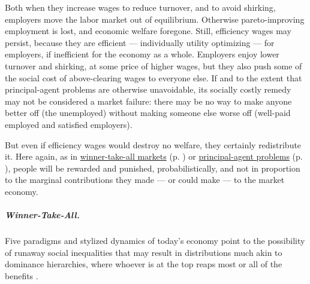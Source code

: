 Both when they increase wages to reduce turnover, and to avoid shirking, employers move the labor market out of equilibrium. Otherwise pareto-improving employment is lost, and economic welfare foregone. Still, efficiency wages may persist, because they are efficient --- individually utility optimizing --- for employers, if inefficient for the economy as a whole. Employers enjoy lower turnover and shirking, at some price of higher wages, but they also push some of the social cost of above-clearing wages to everyone else. If and to the extent that principal-agent problems are otherwise unavoidable, its socially costly remedy may not be considered a market failure: there may be no way to make anyone better off (the unemployed) without making someone else worse off (well-paid employed and satisfied employers).

But even if efficiency wages would destroy no welfare, they certainly redistribute it. Here again, as in \hyperref[sec:winner-take-all]{winner-take-all markets} (p. \pageref{sec:winner-take-all}) or \hyperref[sec:principal-agent_problem]{principal-agent problems} (p. \pageref{sec:principal-agent_problem}), people will be rewarded and punished, probabilistically, and not in proportion to the marginal contributions they made --- or could make --- to the market economy.

\subparagraph[Winner-Take-All]{Winner-Take-All.}  \label{sec:winner-take-all} Five paradigms and stylized dynamics of today's economy point to the possibility of runaway social inequalities that may result in distributions much akin to dominance hierarchies, where whoever is at the top reaps most or all of the benefits \citep{Frank1996}.


